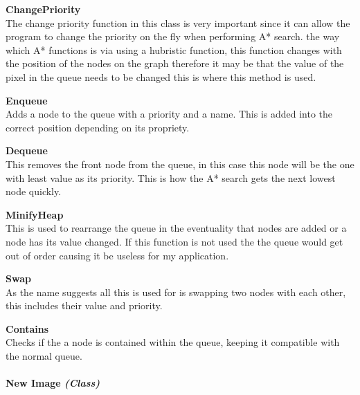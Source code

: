 \begin{FlushLeft}
    \textbf{ChangePriority} \\ \bk
    The change priority function in this class is very important since it can allow the program to change the priority on the fly when performing A* search. the way which A* functions is via using a hubristic function, this function changes with the position of the nodes on the graph therefore it may be that the value of the pixel in the queue needs to be changed this is where this method is used.  \\ \bk

    \textbf{Enqueue} \\ \bk
    Adds a node to the queue with a priority and a name. This is added into the correct position depending on its propriety.\\ \bk

    \textbf{Dequeue} \\ \bk
    This removes the front node from the queue, in this case this node will be the one with least value as its priority. This is how the A* search gets the next lowest node quickly.\\ \bk

    \textbf{MinifyHeap} \\ \bk
    This is used to rearrange the queue in the eventuality that nodes are added or a node has its value changed. If this function is not used the the queue would get out of order causing it be useless for my application.

    \textbf{Swap} \\ \bk
    As the name suggests all this is used for is swapping two nodes with each other, this includes their value and priority.

    \textbf{Contains} \\ \bk
    Checks if the a node is contained within the queue, keeping it compatible with the normal queue.

    \bk

    \pagebreak
\paragraph{New Image \textit{(Class)}} \mbox{} \\

    \begin{figure}[H]
        \centering
    \end{figure}\\


\end{FlushLeft}
